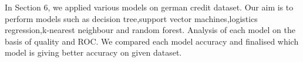 \documentclass{article}\usepackage[]{graphicx}\usepackage[]{color}
\begin{document}
\par In Section 6, we applied various models on german credit dataset. Our aim is to perform models such as decision tree,support vector machines,logistics regression,k-nearest neighbour and random forest. Analysis of each model on the basis of quality and ROC. We compared each model accuracy and finalised which model is giving better accuracy on given dataset.\\
%
%
%
%

\end{document}
